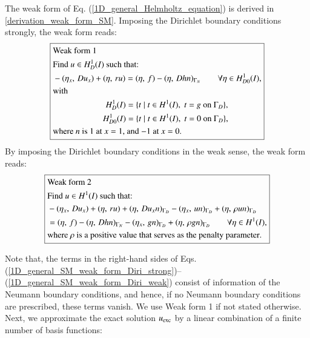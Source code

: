 \documentclass[review,3p]{elsarticle}
\begin{document}
The weak form of Eq. (\ref{1D_general_Helmholtz_equation}) is derived in \ref{derivation_weak_form_SM}. Imposing the Dirichlet boundary conditions strongly, the weak form reads:
\begin{equation}
\centering
\boxed{ 
\begin{aligned}
&\text{Weak~form}~ 1 ~~~~~~~~~\\
&\text{Find $u \in H _D^1 (I)$ such that:} \\
&-({ \eta} _{ x }, \,D { u} _{ x }  ) + (\eta, \, ru) = (\eta, \, f ) - (\eta, \, D h {n} )_{\Gamma _N} \qquad \forall \eta \in H _{D0}^1 (I),\\
&\text{with} \\
&~~~~~~~~~~~~~~~~~~~~~~~~~H_{D} ^1 (I) = \{t \; | \; t \in H^1 (I), \; t = g \text{ on } \Gamma _D \},  \\
&~~~~~~~~~~~~~~~~~~~~~~~\,H_{D0} ^1 (I) = \{t \; | \; t \in H^1 (I), \; t = 0 \text{ on } \Gamma _D\},\\
&\text{where } {n} \text{ is 1 at $x=1$, and $-1$ at $x=0$.}
\end{aligned}		\label{1D_general_SM_weak_form_Diri_strong} 
}
\end{equation}
By imposing the Dirichlet boundary conditions in the weak sense, the weak form reads:
\begin{equation}
\centering
\boxed{
\begin{aligned}
&\text{Weak~form}~ 2 ~~~~~~~~~\\
&\text{Find } u \in H ^1 (I) \text{ such that:}\\
& - ( { \eta} _{ x }, \, D { u} _{ x } ) + (\eta, \, ru) + (\eta, \, D u_x n )_{\Gamma _D} - (\eta _x, \, u n )_{\Gamma _D} + (\eta, \, \rho u n )_{\Gamma _D} \\ 
&= (\eta, \, f ) - (\eta, \, D h n )_{\Gamma _N} - (\eta _x, \, g n )_{\Gamma _D} + (\eta, \, \rho g n )_{\Gamma _D} \qquad \forall \eta \in H ^1 (I), \\
&\text{where } \rho \text{ is a } \text{{positive}} \text{ value that serves as the penalty parameter}.
\end{aligned}	\label{1D_general_SM_weak_form_Diri_weak}
}
\end{equation}

\noindent Note that, the terms in the right-hand sides of Eqs. (\ref{1D_general_SM_weak_form_Diri_strong})--(\ref{1D_general_SM_weak_form_Diri_weak}) consist of information of the Neumann boundary conditions, and hence, if no Neumann boundary conditions are prescribed, these terms vanish. We use Weak form 1 if not stated otherwise.
Next, we approximate the exact solution $u_{\rm exc}$ by a linear combination of a finite number of basis functions:
\end{document}
